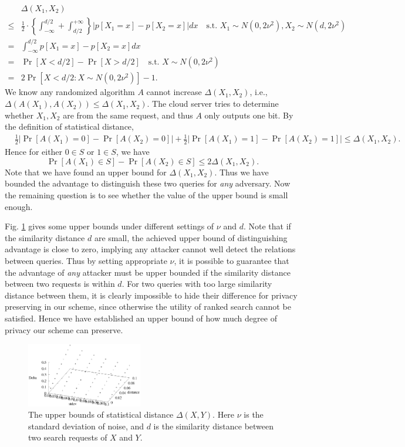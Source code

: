 \documentclass{article}
\begin{document}
$$
\begin{aligned}
&\Delta(X_1, X_2) \\
\leq& \frac{1}{2}\cdot\left\{ \int_{-\infty}^{d/2} + \int_{d/2}^{+\infty} \right\} \bigg|p[X_1 = x] - p[X_2 = x]\bigg|dx 
\quad \textrm{s.t. } X_1\sim N(0,2\nu^2), X_2\sim N(d,2\nu^2)\\
=& \int_{-\infty}^{d/2} p[X_1 = x] - p[X_2 = x] dx \\
=& \Pr[X<d/2] - \Pr[X>d/2] \quad \textrm{s.t. } X\sim N(0,2\nu^2) \\
=& 2\Pr[X<d/2: X\sim N(0,2\nu^2)]-1.
\end{aligned}
$$
We know any randomized algorithm $A$ cannot increase $\Delta(X_1, X_2)$, i.e., $\Delta(A(X_1), A(X_2)) \leq \Delta(X_1, X_2)$. The cloud server tries to determine whether $X_1, X_2$ are from the same request, and thus $A$ only outputs one bit. By the definition of statistical distance,
$$\begin{aligned}
&\frac{1}{2}|\Pr[A(X_1)=0]-\Pr[A(X_2)=0]| 
+ \frac{1}{2}|\Pr[A(X_1)=1]-\Pr[A(X_2)=1]| 
\leq \Delta(X_1, X_2).
\end{aligned}$$
Hence for either $0\in S$ or $1\in S$, we have
$$\Pr[A(X_1)\in S]-\Pr[A(X_2)\in S] \leq 2 \Delta(X_1, X_2).$$
Note that we have found an upper bound for $\Delta(X_1, X_2)$. Thus we have bounded the advantage to distinguish these two queries for \emph{any} adversary. Now the remaining question is to see whether the value of the upper bound is small enough.

Fig. \ref{fig:diff_factors} gives some upper bounds under different settings of $\nu$ and $d$. Note that if the similarity distance $d$ are small, the achieved upper bound of distinguishing advantage is close to zero, implying any attacker cannot well detect the relations between queries. Thus by setting appropriate $\nu$, it is possible to guarantee that the advantage of \emph{any} attacker must be upper bounded if the similarity distance between two requests is within $d$. For two queries with too large similarity distance between them, it is clearly impossible to hide their difference for privacy preserving in our scheme, since otherwise the utility of ranked search cannot be satisfied.
Hence we have established an upper bound of how much degree of privacy our scheme can preserve.

\begin{figure}
\centering
\includegraphics[width=0.45\textwidth]{stdev1samples.eps}
\caption{The upper bounds of statistical distance $\Delta(X, Y)$. Here $\nu$ is the standard deviation of noise, and $d$ is the similarity distance between two search requests of $X$ and $Y$.}
\label{fig:diff_factors}
\end{figure}



\end{document}

